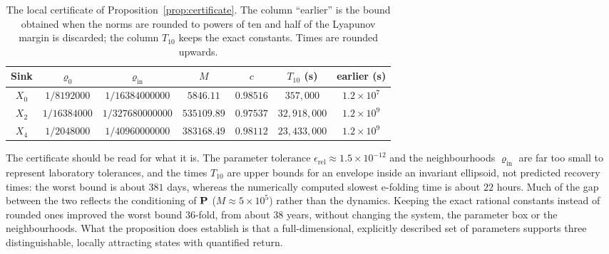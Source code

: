 \begin{table}[ht]
\centering
\caption{The local certificate of Proposition~\ref{prop:certificate}. The column ``earlier''
is the bound obtained when the norms are rounded to powers of ten and half of the Lyapunov
margin is discarded; the column \(T_{10}\) keeps the exact constants. Times are rounded
upwards.}\label{tab:certificate}
\begin{tabular}{ccccccc}
\toprule
Sink & \(\varrho_0\) & \(\varrho_{\mathrm{in}}\) & \(M\) & \(c\) & \(T_{10}\) (s) & earlier (s)\\
\midrule
\(X_0\) & \(1/8192000\) & \(1/16384000000\) & \(5846.11\) & \(0.98516\) & \(357{,}000\) & \(1.2\times10^{7}\)\\
\(X_2\) & \(1/16384000\) & \(1/327680000000\) & \(535109.89\) & \(0.97537\) & \(32{,}918{,}000\) & \(1.2\times10^{9}\)\\
\(X_4\) & \(1/2048000\) & \(1/40960000000\) & \(383168.49\) & \(0.98112\) & \(23{,}433{,}000\) & \(1.2\times10^{9}\)\\
\bottomrule
\end{tabular}
\end{table}

The certificate should be read for what it is. The parameter tolerance
\(\epsilon_{\mathrm{rel}}\approx1.5\times10^{-12}\) and the neighbourhoods
\(\varrho_{\mathrm{in}}\) are far too small to represent laboratory tolerances, and the times
\(T_{10}\) are upper bounds for an envelope inside an invariant ellipsoid, not predicted
recovery times: the worst bound is about \(381\) days, whereas the numerically computed slowest
e-folding time is about \(22\) hours. Much of the gap between the two reflects the conditioning of
\(\mathbf P\) (\(M\approx5\times10^5\)) rather than the dynamics. Keeping the exact rational
constants instead of rounded ones improved the worst bound \(36\)-fold, from about \(38\)
years, without changing the system, the parameter box or the neighbourhoods. What the
proposition does establish is that a full-dimensional, explicitly described set of parameters
supports three distinguishable, locally attracting states with quantified return.

